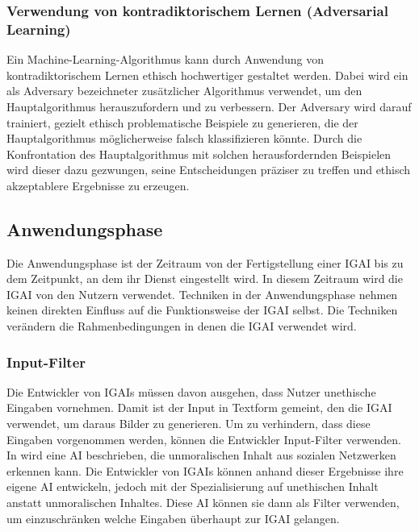 \documentclass[12pt]{report}
\begin{document}
\subsubsection{Verwendung von kontradiktorischem Lernen (Adversarial Learning)}
Ein Machine-Learning-Algorithmus kann durch Anwendung von kontradiktorischem Lernen ethisch hochwertiger gestaltet werden. Dabei wird ein als Adversary bezeichneter zusätzlicher Algorithmus verwendet, um den Hauptalgorithmus herauszufordern und zu verbessern. \cite[S. 3]{Kurakin} Der Adversary wird darauf trainiert, gezielt ethisch problematische Beispiele zu generieren, die der Hauptalgorithmus möglicherweise falsch klassifizieren könnte. Durch die Konfrontation des Hauptalgorithmus mit solchen herausfordernden Beispielen wird dieser dazu gezwungen, seine Entscheidungen präziser zu treffen und ethisch akzeptablere Ergebnisse zu erzeugen.

\subsection{Anwendungsphase}

Die Anwendungsphase ist der Zeitraum von der Fertigstellung einer IGAI bis zu dem Zeitpunkt, an dem ihr Dienst eingestellt wird. In diesem Zeitraum wird die IGAI von den Nutzern verwendet. Techniken in der Anwendungsphase nehmen keinen direkten Einfluss auf die Funktionsweise der IGAI selbst. Die Techniken verändern die Rahmenbedingungen in denen die IGAI verwendet wird.

\subsubsection{Input-Filter}
Die Entwickler von IGAIs müssen davon ausgehen, dass Nutzer unethische Eingaben vornehmen. Damit ist der Input in Textform gemeint, den die IGAI verwendet, um daraus Bilder zu generieren. Um zu verhindern, dass diese Eingaben vorgenommen werden, können die Entwickler Input-Filter verwenden. In \cite[Artificial Intelligence as a Service for Immoral ContentDetection and Eradication]{Shah} wird eine AI beschrieben, die unmoralischen Inhalt aus sozialen Netzwerken erkennen kann. Die Entwickler von IGAIs können anhand dieser Ergebnisse ihre eigene AI entwickeln, jedoch mit der Spezialisierung auf unethischen Inhalt anstatt unmoralischen Inhaltes. Diese AI können sie dann als Filter verwenden, um einzuschränken welche Eingaben überhaupt zur IGAI gelangen.
\end{document}
